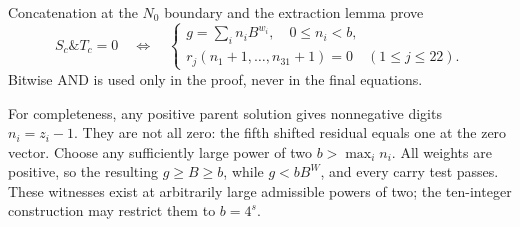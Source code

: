 Concatenation at the \(N_0\) boundary and the extraction lemma prove
\begin{equation}
 S_c\mathbin{\&}T_c=0
 \quad\Longleftrightarrow\quad
 \left\{
 \begin{array}{l}
 g=\sum_i n_iB^{w_i},\quad0\le n_i<b,\\
 r_j(n_1+1,\ldots,n_{31}+1)=0\quad(1\le j\le22).
 \end{array}\right.
 \label{eq:channel-zero}
\end{equation}
Bitwise AND is used only in the proof, never in the final equations.

For completeness, any positive parent solution gives nonnegative digits
\(n_i=z_i-1\).  They are not all zero: the fifth shifted residual equals
one at the zero vector.  Choose any sufficiently large power of two
\(b>\max_i n_i\).  All weights are positive, so the resulting
\(g\ge B\ge b\), while \(g<bB^W\), and every carry test passes.
These witnesses exist at arbitrarily large admissible powers of two;
the ten-integer construction may restrict them to \(b=4^s\).
